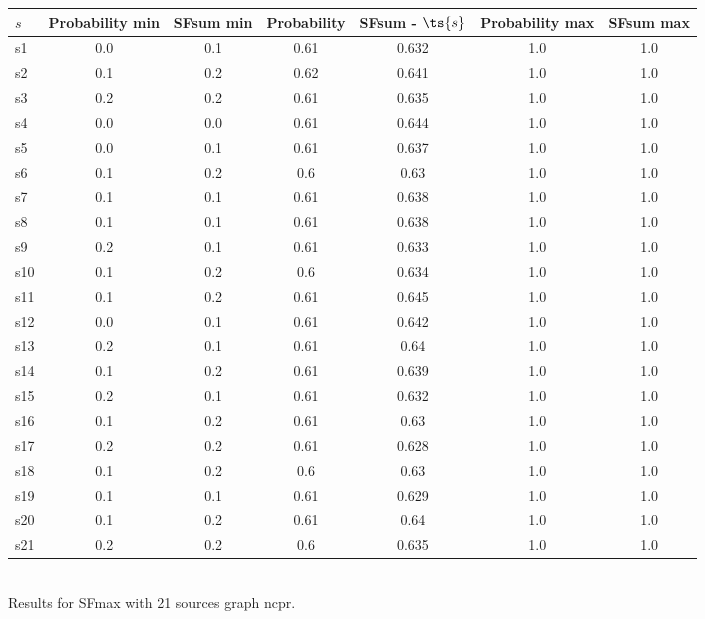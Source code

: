 \documentclass{article}
\begin{document}
\noindent\begin{tabular}{|l|c|c|c|c|c|c|}
\hline
$s$& Probability min & SFsum min & Probability & SFsum - $\ts{s}$ & Probability max & SFsum max\\
\hline
s1 &0.0 & 0.1 & 0.61 & 0.632 & 1.0 & 1.0\\
\hline
s2 &0.1 & 0.2 & 0.62 & 0.641 & 1.0 & 1.0\\
\hline
s3 &0.2 & 0.2 & 0.61 & 0.635 & 1.0 & 1.0\\
\hline
s4 &0.0 & 0.0 & 0.61 & 0.644 & 1.0 & 1.0\\
\hline
s5 &0.0 & 0.1 & 0.61 & 0.637 & 1.0 & 1.0\\
\hline
s6 &0.1 & 0.2 & 0.6 & 0.63 & 1.0 & 1.0\\
\hline
s7 &0.1 & 0.1 & 0.61 & 0.638 & 1.0 & 1.0\\
\hline
s8 &0.1 & 0.1 & 0.61 & 0.638 & 1.0 & 1.0\\
\hline
s9 &0.2 & 0.1 & 0.61 & 0.633 & 1.0 & 1.0\\
\hline
s10 &0.1 & 0.2 & 0.6 & 0.634 & 1.0 & 1.0\\
\hline
s11 &0.1 & 0.2 & 0.61 & 0.645 & 1.0 & 1.0\\
\hline
s12 &0.0 & 0.1 & 0.61 & 0.642 & 1.0 & 1.0\\
\hline
s13 &0.2 & 0.1 & 0.61 & 0.64 & 1.0 & 1.0\\
\hline
s14 &0.1 & 0.2 & 0.61 & 0.639 & 1.0 & 1.0\\
\hline
s15 &0.2 & 0.1 & 0.61 & 0.632 & 1.0 & 1.0\\
\hline
s16 &0.1 & 0.2 & 0.61 & 0.63 & 1.0 & 1.0\\
\hline
s17 &0.2 & 0.2 & 0.61 & 0.628 & 1.0 & 1.0\\
\hline
s18 &0.1 & 0.2 & 0.6 & 0.63 & 1.0 & 1.0\\
\hline
s19 &0.1 & 0.1 & 0.61 & 0.629 & 1.0 & 1.0\\
\hline
s20 &0.1 & 0.2 & 0.61 & 0.64 & 1.0 & 1.0\\
\hline
s21 &0.2 & 0.2 & 0.6 & 0.635 & 1.0 & 1.0\\
\hline
\end{tabular}\\

\noindent Results for SFmax with 21 sources graph ncpr.
\end{document}
